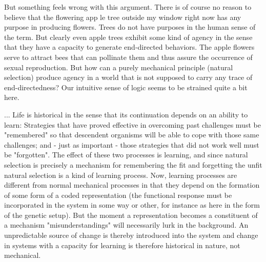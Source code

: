 \begin{longquote}
But something feels wrong with this argument. There is of course no reason 
to believe that the flowering app le tree outside my window right now has any purpose 
in producing flowers. Trees do not have purposes in the human sense of the term. But 
clearly even apple trees exhibit some kind of agency in the sense that they have a 
capacity to generate end-directed behaviors. The apple flowers serve to attract bees 
that can pollinate them and thus assure the occurrence of sexual reproduction. But 
how can a purely mechanical principle (natural selection) produce agency in a world 
that is not supposed to carry any trace of end-directedness? Our intuitive sense of 
logic seems to be strained quite a bit here.

...
Life is historical in the sense that its continuation depends on an ability to learn: Strategies 
that have proved effective in overcoming past challenges must be "remembered" so 
that descendent organisms will be able to cope with those same challenges; and 
- just as important -
 those strategies that did not work well must be "forgotten". The effect of these two processes is 
learning, and since natural selection is precisely a mechanism for remembering the fit and forgetting the unfit natural selection is a kind 
of learning process. Now, learning processes are different from normal mechanical 
processes in that they depend on the formation of some form of a coded 
representation (the functional response must be incorporated in the system in some 
way or other, for instance as here in the form of the genetic setup). But the moment a 
representation becomes a constituent of a mechanism "misunderstandings" will 
necessarily lurk in the background. An unpredictable source of change is thereby 
introduced into the system and change in systems with a capacity for learning is 
therefore historical in nature, not mechanical.


\end{longquote}
